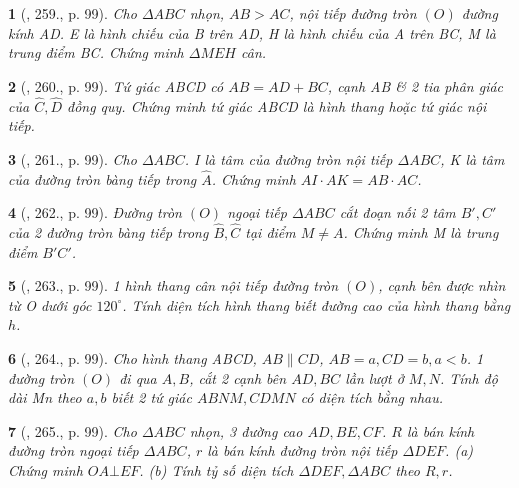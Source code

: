 \documentclass{article}
\newtheorem{baitoan}{}
\begin{document}
\begin{baitoan}[\cite{Binh_Toan_9_tap_2}, 259., p. 99]
	Cho $\Delta ABC$ nhọn, $AB > AC$, nội tiếp đường tròn $(O)$ đường kính AD. E là hình chiếu của B trên AD, H là hình chiếu của A trên BC, M là trung điểm BC. Chứng minh $\Delta MEH$ cân.
\end{baitoan}

\begin{baitoan}[\cite{Binh_Toan_9_tap_2}, 260., p. 99]
	Tứ giác ABCD có $AB = AD + BC$, cạnh AB \& 2 tia phân giác của $\widehat{C},\widehat{D}$ đồng quy. Chứng minh tứ giác ABCD là hình thang hoặc tứ giác nội tiếp.
\end{baitoan}

\begin{baitoan}[\cite{Binh_Toan_9_tap_2}, 261., p. 99]
	Cho $\Delta ABC$. I là tâm của đường tròn nội tiếp $\Delta ABC$, K là tâm của đường tròn bàng tiếp trong $\widehat{A}$. Chứng minh $AI\cdot AK = AB\cdot AC$.
\end{baitoan}

\begin{baitoan}[\cite{Binh_Toan_9_tap_2}, 262., p. 99]
	Đường tròn $(O)$ ngoại tiếp $\Delta ABC$ cắt đoạn nối 2 tâm $B',C'$ của 2 đường tròn bàng tiếp trong $\widehat{B},\widehat{C}$ tại điểm $M\ne A$. Chứng minh M là trung điểm $B'C'$.
\end{baitoan}

\begin{baitoan}[\cite{Binh_Toan_9_tap_2}, 263., p. 99]
	1 hình thang cân nội tiếp đường tròn $(O)$, cạnh bên được nhìn từ O dưới góc $120^\circ$. Tính diện tích hình thang biết đường cao của hình thang bằng $h$.
\end{baitoan}

\begin{baitoan}[\cite{Binh_Toan_9_tap_2}, 264., p. 99]
	Cho hình thang ABCD, $AB\parallel CD$, $AB = a,CD = b,a < b$. 1 đường tròn $(O)$ đi qua $A,B$, cắt 2 cạnh bên $AD,BC$ lần lượt ở $M,N$. Tính độ dài Mn theo $a,b$ biết 2 tứ giác $ABNM,CDMN$ có diện tích bằng nhau.
\end{baitoan}

\begin{baitoan}[\cite{Binh_Toan_9_tap_2}, 265., p. 99]
	Cho $\Delta ABC$ nhọn, 3 đường cao $AD,BE,CF$. $R$ là bán kính đường tròn ngoại tiếp $\Delta ABC$, $r$ là bán kính đường tròn nội tiếp $\Delta DEF$. (a) Chứng minh $OA\bot EF$. (b) Tính tỷ số diện tích $\Delta DEF,\Delta ABC$ theo $R,r$.
\end{baitoan}
\end{document}
